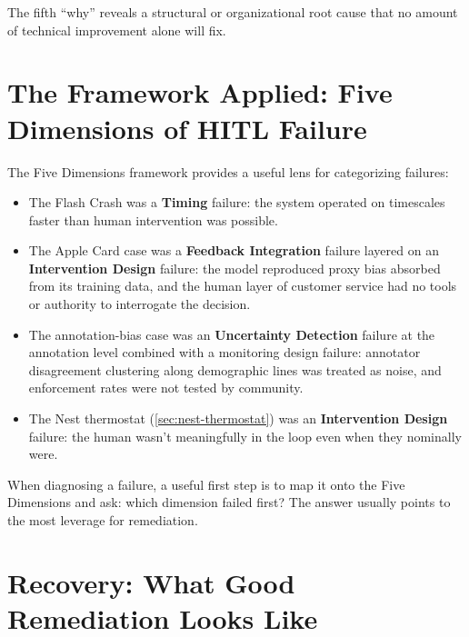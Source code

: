 The fifth ``why'' reveals a structural or organizational root cause that no amount of technical improvement alone will fix.

\section{The Framework Applied: Five Dimensions of HITL Failure}
\label{sec:framework-applied}

The Five Dimensions framework provides a useful lens for categorizing \hitl failures:

\begin{itemize}
    \item The Flash Crash was a \textbf{Timing} failure: the system operated on timescales faster than human intervention was possible.
    \item The Apple Card case was a \textbf{Feedback Integration} failure layered on an \textbf{Intervention Design} failure: the model reproduced proxy bias absorbed from its training data, and the human layer of customer service had no tools or authority to interrogate the decision.
    \item The annotation-bias case was an \textbf{Uncertainty Detection} failure at the annotation level combined with a monitoring design failure: annotator disagreement clustering along demographic lines was treated as noise, and enforcement rates were not tested by community.
    \item The Nest thermostat (\cref{sec:nest-thermostat}) was an \textbf{Intervention Design} failure: the human wasn't meaningfully in the loop even when they nominally were.
\end{itemize}

When diagnosing a \hitl failure, a useful first step is to map it onto the Five Dimensions and ask: which dimension failed first? The answer usually points to the most leverage for remediation.

\section{Recovery: What Good Remediation Looks Like}
\label{sec:recovery}

